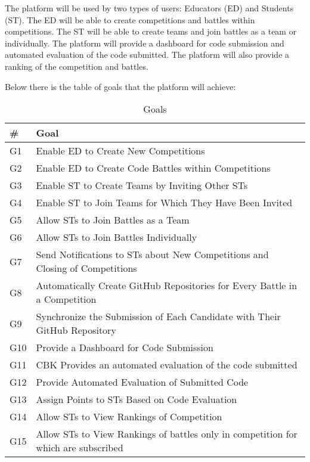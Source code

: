 The platform will be used by two types of users: Educators (ED) and Students (ST). The ED will be able to create competitions and battles within competitions. The ST will be able to create teams and join battles as a team or individually. The platform will provide a dashboard for code submission and automated evaluation of the code submitted. The platform will also provide a ranking of the competition and battles.

Below there is the table of goals that the platform will achieve:
\begin{table}[H]
  \begin{tabular}{|l|l|}
    \hline
    \textbf{\#} & \textbf{Goal}      \\
    \hline
    G1 & Enable ED to Create New Competitions \\
    \hline
    G2 & Enable ED to Create Code Battles within Competitions \\
    \hline
    G3 & Enable ST to Create Teams by Inviting Other STs \\
    \hline
    G4 & Enable ST to Join Teams for Which They Have Been Invited    \\
    \hline
    G5 & Allow STs to Join Battles as a Team    \\
    \hline
    G6 & Allow STs to Join Battles Individually    \\
    \hline
    G7 & Send Notifications to STs about New Competitions and Closing of Competitions    \\
    \hline
    G8 & Automatically Create GitHub Repositories for Every Battle in a Competition    \\
    \hline
    G9 & Synchronize the Submission of Each Candidate with Their GitHub Repository    \\
    \hline
    G10 & Provide a Dashboard for Code Submission    \\
    \hline
    G11 & CBK Provides an automated evaluation of the code submitted  \\
    \hline
    G12 & Provide Automated Evaluation of Submitted Code  \\
    \hline
    G13 & Assign Points to STs Based on Code Evaluation \\
    \hline
    G14 & Allow STs to View Rankings of Competition \\
    \hline
    G15 & Allow STs to View Rankings of  battles only in competition for which are subscribed \\
    \hline
  \end{tabular}
  \caption{Goals}
  \label{tab:goals}
\end{table}

